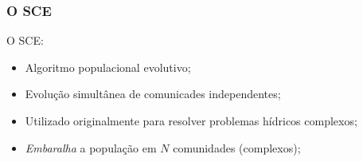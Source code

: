 \documentclass[10pt,xcolor=table,fleqn]{beamer}
\begin{document}
\begin{frame}
	\frametitle{O SCE}
  \begin{block}{O SCE:}
    \begin{itemize}
      \setlength\itemsep{0.8em}
      \item{ Algoritmo populacional evolutivo; }
      \item{ Evolução simultânea de comunicades independentes; }
      \item{ Utilizado originalmente para resolver problemas hídricos complexos; }
      \item{ \textit{Embaralha} a população em $N$ comunidades (complexos); }
    \end{itemize}
  \end{block}
\end{frame}
\end{document}
